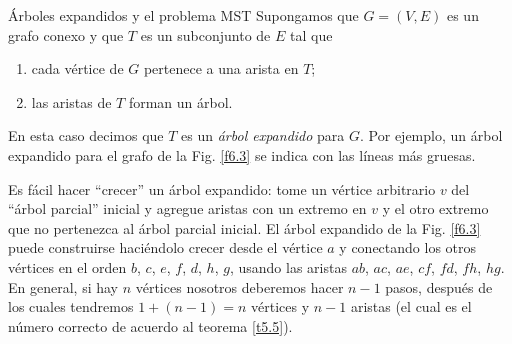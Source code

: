 \begin{section}{Árboles expandidos y el problema MST} \label{6.2}
Supongamos que $G=(V,E)$ es un grafo conexo y que $T$ es un
subconjunto de $E$ tal que
\begin{enumerate}[label=(\alph*)]
\item  cada vértice de $G$ pertenece a una arista en $T$;
\item  las aristas de $T$ forman un árbol.
\end{enumerate}
En esta caso decimos que $T$ es un {\em árbol expandido} para
 $G$. Por ejemplo, un árbol expandido para
el grafo de la Fig. \ref{f6.3} se indica con las líneas más
gruesas.
%


Es fácil hacer ``crecer'' un árbol expandido: tome un vértice
arbitrario $v$ del ``árbol parcial'' inicial y agregue aristas con
un extremo en $v$ y el otro extremo que no pertenezca al árbol
parcial inicial. El árbol expandido de la Fig. \ref{f6.3} puede
construirse haciéndolo crecer desde el vértice $a$ y conectando
los otros vértices en el orden $b$, $c$, $e$, $f$, $d$, $h$, $g$,
usando las aristas $ab$, $ac$, $ae$, $cf$, $fd$, $fh$, $hg$. En
general, si hay $n$ vértices nosotros deberemos hacer $n-1$ pasos,
después de los cuales tendremos $1+(n-1)=n$ vértices y $n-1$
aristas (el cual es el número correcto de acuerdo al teorema
\ref{t5.5}).



\end{section}
